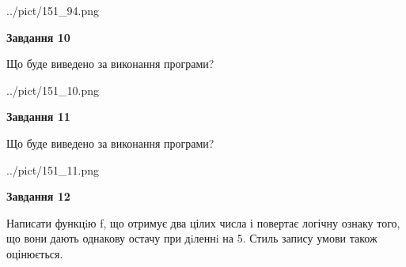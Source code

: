 \documentclass[12pt, ukrainian]{article}
\begin{document}
{\begin {large}
\begin{center}
	{../pict/151_94.png}
\end{center}
\newpage

{\begin {center}\textbf{Завдання 10}\end {center}}

Що буде виведено за виконання програми?\par
\begin{center}
	{../pict/151_10.png}
\end{center}
\newpage

{\begin {center}\textbf{Завдання 11}\end {center}}

Що буде виведено за виконання програми?\par
\begin{center}
	{../pict/151_11.png}
\end{center}
\newpage

{\begin {center}\textbf{Завдання 12}\end {center}}


Написати функцiю f, що отримує два цілих числа і повертає логічну ознаку того, що вони дають однакову остачу при дiленнi на 5. Стиль запису умови також оцінюється.\par
\newpage

\end {large}}
\end{document}
